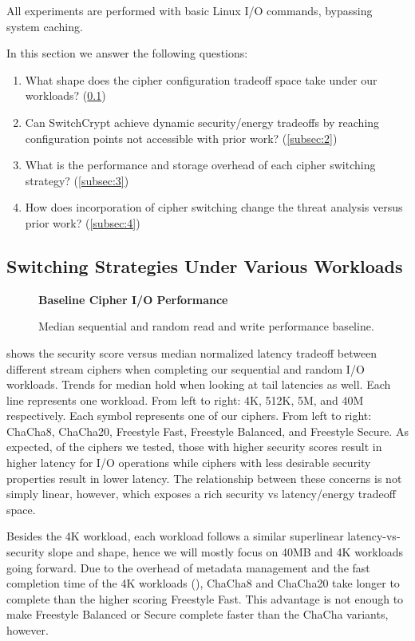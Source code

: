 All experiments are performed with basic Linux I/O commands, bypassing system
caching.

In this section we answer the following questions:

\begin{enumerate}
 \item What shape does the cipher configuration tradeoff space take under
 our workloads? (\cref{subsec:1})
 \item Can SwitchCrypt achieve dynamic security/energy tradeoffs by reaching
 configuration points not accessible with prior work? (\cref{subsec:2})
 \item What is the performance and storage overhead of each cipher switching
 strategy? (\cref{subsec:3})
 \item How does incorporation of cipher switching change the threat analysis
 versus prior work? (\cref{subsec:4})
\end{enumerate}

\subsection{Switching Strategies Under Various Workloads}\label{subsec:1}

\begin{figure}[ht]
  \textbf{Baseline Cipher I/O Performance}\par\medskip
  {} \caption{Median sequential and random
  read and write performance baseline.}
 \label{fig:tradeoff-no-ratios}
\end{figure}

 shows the security score versus median normalized
latency tradeoff between different stream ciphers when completing our sequential
and random I/O workloads. Trends for median hold when looking at tail latencies
as well. Each line represents one workload. From left to right: 4K, 512K, 5M,
and 40M respectively. Each symbol represents one of our ciphers. From left to
right: ChaCha8, ChaCha20, Freestyle Fast, Freestyle Balanced, and Freestyle
Secure. As expected, of the ciphers we tested, those with higher security scores
result in higher latency for I/O operations while ciphers with less desirable
security properties result in lower latency. The relationship between these
concerns is not simply linear, however, which exposes a rich security vs
latency/energy tradeoff space.

Besides the 4K workload, each workload follows a similar superlinear
latency-vs-security slope and shape, hence we will mostly focus on 40MB and 4K
workloads going forward. Due to the overhead of metadata management and the fast
completion time of the 4K workloads (), ChaCha8 and ChaCha20 take longer to complete than the higher scoring
Freestyle Fast. This advantage is not enough to make Freestyle Balanced or
Secure complete faster than the ChaCha variants, however.

